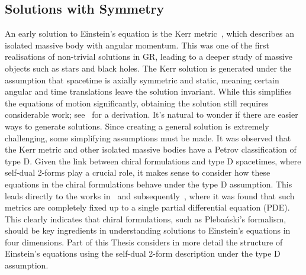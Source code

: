 \documentclass[10pt]{report}
\newcommand{\pleb}[0]{Pleba\'nski}
\theoremstyle{definition}
\begin{document}
\subsection*{Solutions with Symmetry}

An early solution to Einstein's equation is the Kerr metric~\cite{GravitationalFKerr1963}, which describes an isolated massive body with angular momentum. This was one of the first realisations of non-trivial solutions in GR, leading to a deeper study of massive objects such as stars and black holes. The Kerr solution is generated under the assumption that spacetime is axially symmetric and static, meaning certain angular and time translations leave the solution invariant. While this simplifies the equations of motion significantly, obtaining the solution still requires considerable work; see~\cite{TheMathematicaChandr1998} for a derivation. It's natural to wonder if there are easier ways to generate solutions. Since creating a general solution is extremely challenging, some simplifying assumptions must be made. It was observed that the Kerr metric and other isolated massive bodies have a Petrov classification of type D. Given the link between chiral formulations and type D spacetimes, where self-dual 2-forms play a crucial role, it makes sense to consider how these equations in the chiral formulations behave under the type D assumption. This leads directly to the works in~\cite{SelfDualKahleDerdzi1983} and subsequently~\cite{ExplicitSelfDClaude1991}, where it was found that such metrics are completely fixed up to a single partial differential equation (PDE). This clearly indicates that chiral formulations, such as \pleb{}'s formalism, should be key ingredients in understanding solutions to Einstein's equations in four dimensions. Part of this Thesis considers in more detail the structure of Einstein's equations using the self-dual 2-form description under the type D assumption.
\end{document}
